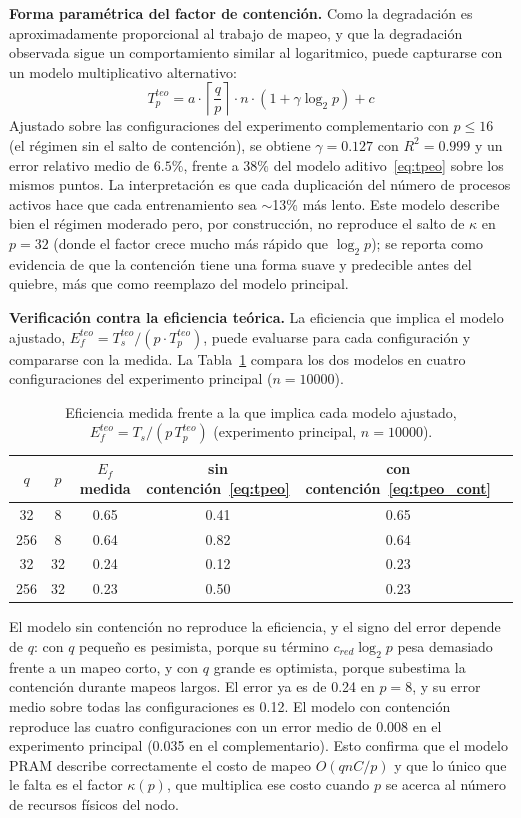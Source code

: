 \documentclass[11pt, a4paper]{article}
\begin{document}
\textbf{Forma paramétrica del factor de contención.} Como la degradación es aproximadamente proporcional al trabajo de mapeo, y que la degradación observada sigue un comportamiento similar al logaritmico, puede capturarse con un modelo multiplicativo alternativo:
\begin{equation}
T_p^{teo} = a \cdot \left\lceil \frac{q}{p} \right\rceil \cdot n \cdot \left(1 + \gamma \log_2 p\right) + c
\label{eq:tpeo_kappa}
\end{equation}
Ajustado sobre las configuraciones del experimento complementario con $p \le 16$ (el régimen sin el salto de contención), se obtiene $\gamma = 0.127$ con $R^2 = 0.999$ y un error relativo medio de $6.5\%$, frente a $38\%$ del modelo aditivo~\eqref{eq:tpeo} sobre los mismos puntos. La interpretación es que cada duplicación del número de procesos activos hace que cada entrenamiento sea $\sim$13\% más lento. Este modelo describe bien el régimen moderado pero, por construcción, no reproduce el salto de $\kappa$ en $p = 32$ (donde el factor crece mucho más rápido que $\log_2 p$); se reporta como evidencia de que la contención tiene una forma suave y predecible antes del quiebre, más que como reemplazo del modelo principal.

\textbf{Verificación contra la eficiencia teórica.} La eficiencia que implica el modelo ajustado, $E_f^{teo} = T_s^{teo}/(p \cdot T_p^{teo})$, puede evaluarse para cada configuración y compararse con la medida. La Tabla~\ref{tab:verif_ef} compara los dos modelos en cuatro configuraciones del experimento principal ($n = 10000$).

\begin{table}[H]
\centering
\small
\caption{Eficiencia medida frente a la que implica cada modelo ajustado, $E_f^{teo} = T_s/(p\,T_p^{teo})$ (experimento principal, $n = 10000$).}
\label{tab:verif_ef}
\begin{tabular}{cccccc}
\toprule
$q$ & $p$ & $E_f$ medida & sin contención~\eqref{eq:tpeo} & con contención~\eqref{eq:tpeo_cont} \\
\midrule
32  & 8  & 0.65 & 0.41 & 0.65 \\
256 & 8  & 0.64 & 0.82 & 0.64 \\
32  & 32 & 0.24 & 0.12 & 0.23 \\
256 & 32 & 0.23 & 0.50 & 0.23 \\
\bottomrule
\end{tabular}
\end{table}

El modelo sin contención no reproduce la eficiencia, y el signo del error depende de $q$: con $q$ pequeño es pesimista, porque su término $c_{red}\log_2 p$ pesa demasiado frente a un mapeo corto, y con $q$ grande es optimista, porque subestima la contención durante mapeos largos. El error ya es de 0.24 en $p = 8$, y su error medio sobre todas las configuraciones es 0.12. El modelo con contención reproduce las cuatro configuraciones con un error medio de 0.008 en el experimento principal (0.035 en el complementario). Esto confirma que el modelo PRAM describe correctamente el costo de mapeo $O(qnC/p)$ y que lo único que le falta es el factor $\kappa(p)$, que multiplica ese costo cuando $p$ se acerca al número de recursos físicos del nodo.
\end{document}

